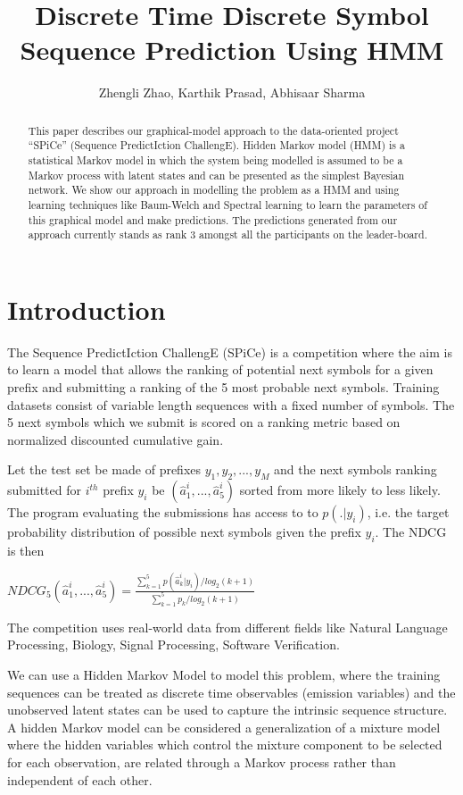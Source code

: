 \documentclass[letterpaper]{article}
\title{Discrete Time Discrete Symbol Sequence Prediction Using HMM}
\author{Zhengli Zhao, Karthik Prasad, Abhisaar Sharma}
\begin{document}
\maketitle
\begin{abstract}
This paper describes our graphical-model approach to the data-oriented project “SPiCe” (Sequence PredictIction ChallengE). Hidden Markov model (HMM) is a statistical Markov model in which the system being modelled is assumed to be a Markov process with latent states and can be presented as the simplest Bayesian network. We show our approach in modelling the problem as a HMM and using learning techniques like Baum-Welch and Spectral learning to learn the parameters of this graphical model and make predictions. The predictions generated from our approach currently stands as rank 3 amongst all the participants on the leader-board.

\end{abstract}

\section{Introduction}
The Sequence PredictIction ChallengE (SPiCe) is a competition where the aim is to learn a model that allows the ranking of potential next symbols for a given prefix and submitting a ranking of the 5 most probable next symbols. Training datasets consist of variable length sequences with a fixed number of symbols. The 5 next symbols which we submit is scored on a ranking metric based on normalized discounted cumulative gain.

Let the test set be made of prefixes $y_{1},y_{2},..., y_{M}$ and the next symbols ranking submitted for $i^{th}$ prefix $y_{i}$ be $(\hat{a}^{i}_{1},...,\hat{a}^{i}_{5})$ sorted from more likely to less likely. The program evaluating the submissions has access to to $p(.|y_{i})$, i.e. the target probability distribution of possible next symbols given the prefix $y_{i}$. The NDCG is then
\begin{center}
$\displaystyle NDCG_{5}(\hat{a}^{i}_{1},...,\hat{a}^{i}_{5}) = \frac{\sum_{k=1}^{5}p(\hat{a}_{k}^{i}| y_{i}) / log_{2}(k+1)}{\sum_{k=1}^{5}p_{k} / log_{2}(k+1)} $  
\end{center}

The competition uses real-world data from different fields like Natural Language Processing, Biology, Signal Processing, Software Verification. 

We can use a Hidden Markov Model to model this problem, where the training sequences can be treated as discrete time observables (emission variables) and the unobserved latent states can be used to capture the intrinsic sequence structure. A hidden Markov model can be considered a generalization of a mixture model where the hidden variables which control the mixture component to be selected for each observation, are related through a Markov process rather than independent of each other. 
\end{document}
